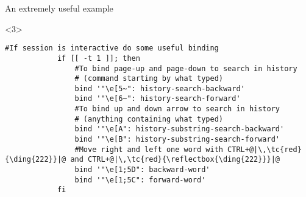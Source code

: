 \begin{frame}[fragile]{An extremely useful example}
    \begin{onlyenv}<3>
        \begin{lstlisting}[style=myBash]
            #If session is interactive do some useful binding
            if [[ -t 1 ]]; then
                #To bind page-up and page-down to search in history
                # (command starting by what typed)
                bind '"\e[5~": history-search-backward'
                bind '"\e[6~": history-search-forward'
                #To bind up and down arrow to search in history
                # (anything containing what typed)
                bind '"\e[A": history-substring-search-backward'
                bind '"\e[B": history-substring-search-forward'
                #Move right and left one word with CTRL+@|\,\tc{red}{\ding{222}}|@ and CTRL+@|\,\tc{red}{\reflectbox{\ding{222}}}|@
                bind '"\e[1;5D": backward-word'
                bind '"\e[1;5C": forward-word'
            fi
        \end{lstlisting}
    \end{onlyenv}
\end{frame}
